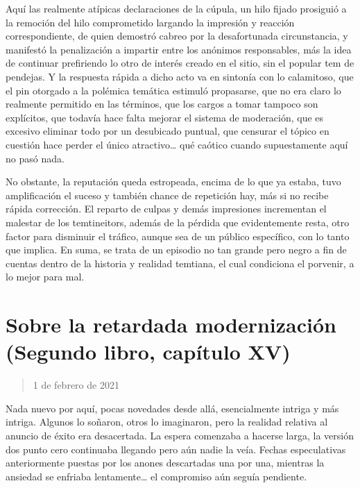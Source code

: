 \documentclass[
]{book}
\begin{document}
Aquí las realmente atípicas declaraciones de la cúpula, un hilo fijado prosiguió a la remoción del hilo comprometido largando la impresión y reacción correspondiente, de quien demostró cabreo por la desafortunada circunstancia, y manifestó la penalización a impartir entre los anónimos responsables, más la idea de continuar prefiriendo lo otro de interés creado en el sitio, sin el popular tem de pendejas. Y la respuesta rápida a dicho acto va en sintonía con lo calamitoso, que el pin otorgado a la polémica temática estimuló propasarse, que no era claro lo realmente permitido en las términos, que los cargos a tomar tampoco son explícitos, que todavía hace falta mejorar el sistema de moderación, que es excesivo eliminar todo por un desubicado puntual, que censurar el tópico en cuestión hace perder el único atractivo\ldots{} qué caótico cuando supuestamente aquí no pasó nada.

No obstante, la reputación queda estropeada, encima de lo que ya estaba, tuvo amplificación el suceso y también chance de repetición hay, más si no recibe rápida corrección. El reparto de culpas y demás impresiones incrementan el malestar de los temtineitors, además de la pérdida que evidentemente resta, otro factor para disminuir el tráfico, aunque sea de un público específico, con lo tanto que implica. En suma, se trata de un episodio no tan grande pero negro a fin de cuentas dentro de la historia y realidad temtiana, el cual condiciona el porvenir, a lo mejor para mal.

\hypertarget{sobre-la-retardada-modernizaciuxf3n-segundo-libro-capuxedtulo-xv}{%
\section{Sobre la retardada modernización (Segundo libro, capítulo XV)}\label{sobre-la-retardada-modernizaciuxf3n-segundo-libro-capuxedtulo-xv}}

\begin{quote}
1 de febrero de 2021
\end{quote}

Nada nuevo por aquí, pocas novedades desde allá, esencialmente intriga y más intriga. Algunos lo soñaron, otros lo imaginaron, pero la realidad relativa al anuncio de éxito era desacertada. La espera comenzaba a hacerse larga, la versión dos punto cero continuaba llegando pero aún nadie la veía. Fechas especulativas anteriormente puestas por los anones descartadas una por una, mientras la ansiedad se enfriaba lentamente\ldots{} el compromiso aún seguía pendiente.
\end{document}
